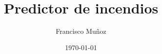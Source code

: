 \documentclass{beamer}
\title{Predictor de incendios}
\author{Francisco Muñoz}
\date{\today}
\begin{document}
\frame{\titlepage}

\end{document}
